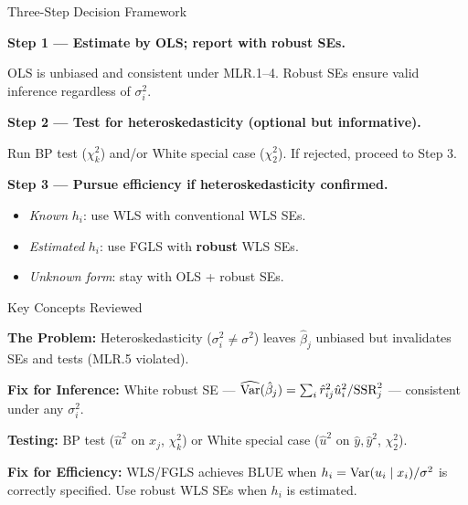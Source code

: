 \documentclass[aspectratio=169, 12pt]{beamer}
\begin{document}
\begin{frame}[shrink=8]{Three-Step Decision Framework}

  \begin{highlightbox}
    \textbf{Step 1 — Estimate by OLS; report with robust SEs.}

    OLS is unbiased and consistent under MLR.1--4. Robust SEs ensure valid inference regardless of $\sigma_i^2$.

    \smallskip

    \textbf{Step 2 — Test for heteroskedasticity (optional but informative).}

    Run BP test ($\chi^2_k$) and/or White special case ($\chi^2_2$). If rejected, proceed to Step 3.

    \smallskip

    \textbf{Step 3 — Pursue efficiency if heteroskedasticity confirmed.}
    \begin{itemize}
      \item \textit{Known} $h_i$: use WLS with conventional WLS SEs.
      \item \textit{Estimated} $h_i$: use FGLS with \textbf{robust} WLS SEs.
      \item \textit{Unknown form}: stay with OLS + robust SEs.
    \end{itemize}
  \end{highlightbox}

\end{frame}

\begin{frame}[shrink=8]{Key Concepts Reviewed}

  \begin{keybox}
    \textbf{The Problem:} Heteroskedasticity ($\sigma_i^2 \neq \sigma^2$) leaves $\hat{\beta}_j$ unbiased but invalidates SEs and tests (MLR.5 violated).

    \smallskip
    \textbf{Fix for Inference:} White robust SE — $\widehat{\operatorname{Var}}(\hat{\beta}_j) = \sum_i \hat{r}_{ij}^2 \hat{u}_i^2 / \text{SSR}_j^2$ — consistent under any $\sigma_i^2$.

    \smallskip
    \textbf{Testing:} BP test ($\hat{u}^2$ on $x_j$, $\chi^2_k$) or White special case ($\hat{u}^2$ on $\hat{y}, \hat{y}^2$, $\chi^2_2$).

    \smallskip
    \textbf{Fix for Efficiency:} WLS/FGLS achieves BLUE when $h_i = \operatorname{Var}(u_i \mid x_i)/\sigma^2$ is correctly specified. Use robust WLS SEs when $h_i$ is estimated.
  \end{keybox}

\end{frame}
\end{document}
